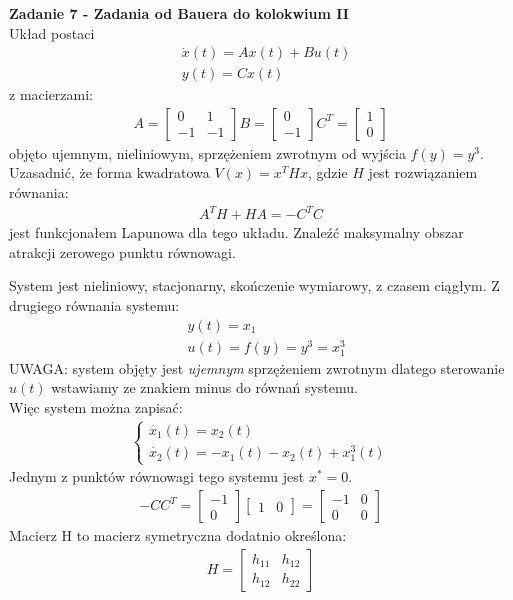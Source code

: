 \documentclass[a4paper,11pt]{article}
\begin{document}
\newpage
\begin{framed}
\textbf{Zadanie 7 - Zadania od Bauera do kolokwium II } \\ 
Układ postaci
\begin{align*}
&\dot{x}(t)=Ax(t)+Bu(t) \\
&y(t)=Cx(t) 
\end{align*}
z macierzami:
\begin{align*}
A =
\begin{bmatrix}
0 & 1 \\
-1 & -1 
\end{bmatrix}
B =
\begin{bmatrix}
0  \\
-1  
\end{bmatrix}
C^{T} =
\begin{bmatrix}
1  \\
0 
\end{bmatrix}
\end{align*}
objęto ujemnym, nieliniowym, sprzężeniem zwrotnym od wyjścia \( f(y)=y^{3} \). Uzasadnić, że forma kwadratowa \( V(x)=x^{T}Hx \), gdzie \( H \) jest rozwiązaniem równania: 
\begin{align*}
A^{T}H+HA=-C^{T}C
\end{align*} 
jest funkcjonałem Lapunowa dla tego układu. Znaleźć maksymalny obszar atrakcji zerowego punktu równowagi.
\end{framed}
System jest nieliniowy, stacjonarny, skończenie wymiarowy, z czasem ciągłym. Z drugiego równania systemu:
\begin{align*}
&y(t) = x_{1} \\
&u(t) = f(y) = y^{3} = x_{1}^{3}
\end{align*}
UWAGA: system objęty jest \textit{ujemnym} sprzężeniem zwrotnym dlatego sterowanie \( u(t) \) wstawiamy ze znakiem minus do równań systemu. \\
Więc system można zapisać: \\
\begin{align*}
\begin{cases}
\dot{x_{1}}(t)= x_{2}(t) \\
\dot{x_{2}}(t)= -x_{1}(t)-x_{2}(t)+x_{1}^{3}(t)
\end{cases}
\end{align*}
Jednym z punktów równowagi tego systemu jest \( x^{*} = 0 \). 
\begin{align*}
-CC^{T}=
\begin{bmatrix}
-1 \\ 0
\end{bmatrix}
\begin{bmatrix}
1 & 0
\end{bmatrix}
=
\begin{bmatrix}
-1 & 0 \\
0 & 0
\end{bmatrix}
\end{align*}
Macierz H to macierz symetryczna dodatnio określona:
\begin{align*}
H = 
\begin{bmatrix}
h_{11} & h_{12} \\
h_{12} & h_{22}
\end{bmatrix}
\end{align*}
\end{document}
